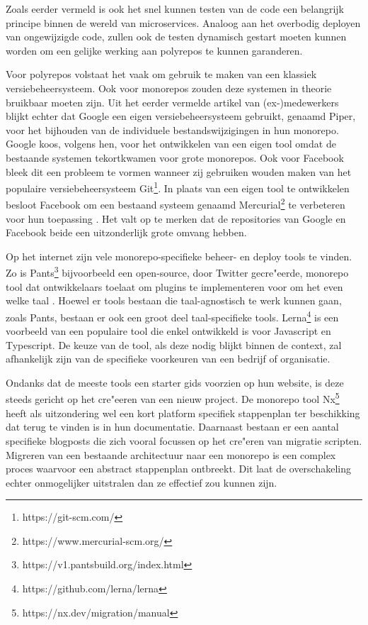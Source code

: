 \documentclass{hogent-article}
\begin{document}
Zoals eerder vermeld is ook het snel kunnen testen van de code een belangrijk principe binnen de wereld van microservices. Analoog aan het overbodig deployen van ongewijzigde code, zullen ook de testen dynamisch gestart moeten kunnen worden om een gelijke werking aan polyrepos te kunnen garanderen. 

Voor polyrepos volstaat het vaak om gebruik te maken van een klassiek versiebeheersysteem. Ook voor monorepos zouden deze systemen in theorie bruikbaar moeten zijn.  
Uit het eerder vermelde artikel van (ex-)medewerkers \textcite{Potvin&Levenberg2016} blijkt echter dat Google een eigen versiebeheersysteem gebruikt, genaamd Piper, voor het bijhouden van de individuele bestandswijzigingen in hun monorepo. Google koos, volgens hen, voor het ontwikkelen van een eigen tool omdat de bestaande systemen tekortkwamen voor grote monorepos.  Ook voor Facebook bleek dit een probleem te vormen wanneer zij gebruiken wouden maken van het populaire versiebeheersysteem Git\footnote{https://git-scm.com/}. In plaats van een eigen tool te ontwikkelen besloot Facebook om een bestaand systeem genaamd Mercurial\footnote{https://www.mercurial-scm.org/} te verbeteren voor hun toepassing \autocite{Goode2014}.
Het valt op te merken dat de repositories van Google en Facebook beide een uitzonderlijk grote omvang hebben.

Op het internet zijn vele monorepo-specifieke beheer- en deploy tools te vinden. Zo is Pants\footnote{https://v1.pantsbuild.org/index.html} bijvoorbeeld een open-source, door Twitter gecre"eerde, monorepo tool dat ontwikkelaars toelaat om plugins te implementeren voor om het even welke taal \autocite{Olson2016}. Hoewel er tools bestaan die taal-agnostisch te werk kunnen gaan, zoals Pants, bestaan er ook een groot deel taal-specifieke tools. Lerna\footnote{https://github.com/lerna/lerna} is een voorbeeld van een populaire tool die enkel ontwikkeld is voor Javascript en Typescript. De keuze van de tool, als deze nodig blijkt binnen de context, zal afhankelijk zijn van de specifieke voorkeuren van een bedrijf of organisatie.

Ondanks dat de meeste tools een starter gids voorzien op hun website, is deze steeds gericht op het cre"eeren van een nieuw project. De monorepo tool Nx\footnote{https://nx.dev/migration/manual} heeft als uitzondering wel een kort platform specifiek stappenplan ter beschikking dat terug te vinden is in hun documentatie. Daarnaast bestaan er een aantal specifieke blogposts die zich vooral focussen op het cre"eren van migratie scripten. Migreren van een bestaande architectuur naar een monorepo is een complex proces waarvoor een abstract stappenplan ontbreekt. Dit laat de overschakeling echter onmogelijker uitstralen dan ze effectief zou kunnen zijn.
\end{document}
